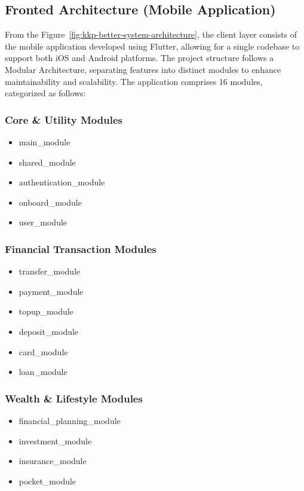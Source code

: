 \documentclass[12pt,oneside,openright,a4paper]{cpe-english-project}
\begin{document}
\subsection{Fronted Architecture (Mobile Application)}

From the Figure~\ref{fig:kkp-better-system-architecture}, the client layer consists of the mobile application developed using
Flutter, allowing for a single codebase to support both iOS and Android
platforms. The project structure follows a Modular Architecture,
separating features into distinct modules to enhance maintainability and
scalability. The application comprises 16 modules, categorized as
follows:

\subsubsection{Core \& Utility Modules}

\begin{itemize}
\item
  main\_module
\item
  shared\_module
\item
  authentication\_module
\item
  onboard\_module
\item
  user\_module
\end{itemize}

\subsubsection{Financial Transaction Modules}

\begin{itemize}
\item
  transfer\_module
\item
  payment\_module
\item
  topup\_module
\item
  deposit\_module
\item
  card\_module
\item
  loan\_module
\end{itemize}

\subsubsection{Wealth \& Lifestyle Modules}

\begin{itemize}
\item
  financial\_planning\_module
\item
  investment\_module
\item
  insurance\_module
\item
  pocket\_module
\end{itemize}
\end{document}
